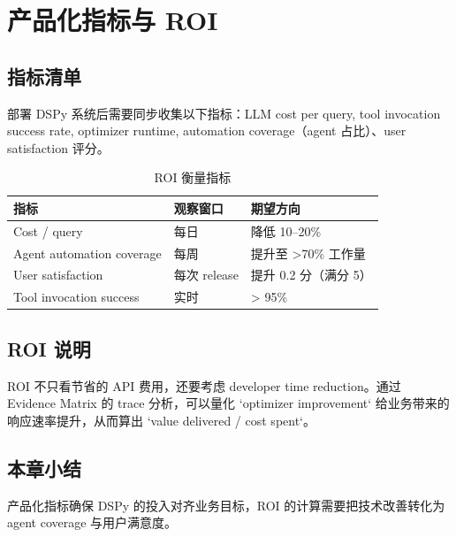 \section{产品化指标与 ROI}

\subsection{指标清单}

部署 DSPy 系统后需要同步收集以下指标：LLM cost per query, tool invocation success rate, optimizer runtime, automation coverage（agent 占比）、user satisfaction 评分。

\begin{table}[H]
\centering
\caption{ROI 衡量指标}
\begin{tabular}{p{}p{}p{}}
\toprule
指标 & 观察窗口 & 期望方向 \\
\midrule
Cost / query & 每日 & 降低 10--20\% \\
Agent automation coverage & 每周 & 提升至 >70\% 工作量 \\
User satisfaction & 每次 release & 提升 0.2 分（满分 5） \\
Tool invocation success & 实时 & > 95\% \\
\bottomrule
\end{tabular}
\end{table}

\subsection{ROI 说明}

ROI 不只看节省的 API 费用，还要考虑 developer time reduction。通过 Evidence Matrix 的 trace 分析，可以量化 `optimizer improvement` 给业务带来的响应速率提升，从而算出 `value delivered / cost spent`。

\subsection{本章小结}

产品化指标确保 DSPy 的投入对齐业务目标，ROI 的计算需要把技术改善转化为 agent coverage 与用户满意度。

